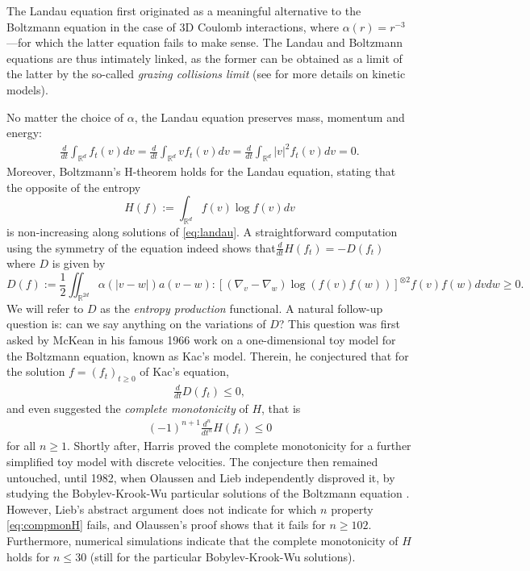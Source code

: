 \documentclass[11pt,a4paper]{article}
\theoremstyle{definition}
\theoremstyle{plain}
\begin{document}
The Landau equation first originated as a meaningful alternative to the Boltzmann equation in the case of 3D Coulomb interactions, where $\alpha(r)=r^{-3}$ —for which the latter equation fails to make sense. The Landau and Boltzmann equations are thus intimately linked, as the former can be obtained as a limit of the latter by the so-called \textit{grazing collisions limit} (see \cite{LifsicPitaevskij2008, Villani2002} for more details on kinetic models).

No matter the choice of $\alpha$, the Landau equation preserves mass, momentum and energy:
\begin{align*}
    \frac{d}{dt}\int_{\mathbb{R}^d} f_t(v)dv=\frac{d}{dt}\int_{\mathbb{R}^d} vf_t(v)dv=\frac{d}{dt}\int_{\mathbb{R}^d} \vert v\vert^2f_t(v)dv=0.
\end{align*}
Moreover, Boltzmann's H-theorem holds for the Landau equation, stating that the opposite of the entropy
$$H(f):=\int_{\mathbb{R}^d} f(v) \log f(v) dv$$
is non-increasing along solutions of \eqref{eq:landau}. A straightforward computation using the symmetry of the equation indeed shows that$\frac{d}{dt}H(f_t)=-D(f_t)$
where $D$ is given by
\begin{equation}
    \label{eq:D}
    D(f):=\frac{1}{2}\iint_{\mathbb{R}^{2d}} \alpha(\vert v-w\vert)a(v-w):\left[(\nabla_v-\nabla_w)\log\left(f(v)f(w)\right)\right]^{\otimes 2}f(v)f(w)dvdw \geq 0.
\end{equation}
We will refer to $D$ as the \textit{entropy production} functional. A natural follow-up question is: can we say anything on the variations of $D$? This question was first asked by McKean in his famous 1966 work \cite{McKean1966} on a one-dimensional toy model for the Boltzmann equation, known as Kac's model. Therein, he conjectured that 
for the solution $f=(f_t)_{t\geq0}$ of Kac's equation,
\begin{align}
\label{eq:mckean2}
    \frac{d}{dt}D(f_t)\leq 0,
\end{align}
and even suggested the \textit{complete monotonicity} of $H$, that is
\begin{align}
\label{eq:compmonH}
    (-1)^{n+1}\frac{d^n}{dt^n}H(f_t)\leq 0
\end{align}
for all $n\geq 1$. Shortly after, Harris \cite{Harris1967} proved the complete monotonicity for a further simplified toy model with discrete velocities. The conjecture then remained untouched, until 1982, when Olaussen \cite{Olaussen1982} and Lieb \cite{Lieb1982} independently disproved it, by studying the Bobylev-Krook-Wu particular solutions of the Boltzmann equation \cite{Bobylev1975a,KrookWu1976}. However, Lieb's abstract argument does not indicate for which $n$ property \eqref{eq:compmonH} fails, and Olaussen's proof shows that it fails for $n\geq 102$. Furthermore, numerical simulations \cite{ZiffMerajverStell1981} indicate that the complete monotonicity of $H$ holds for $n\leq 30$ (still for the particular Bobylev-Krook-Wu solutions).
\end{document}
